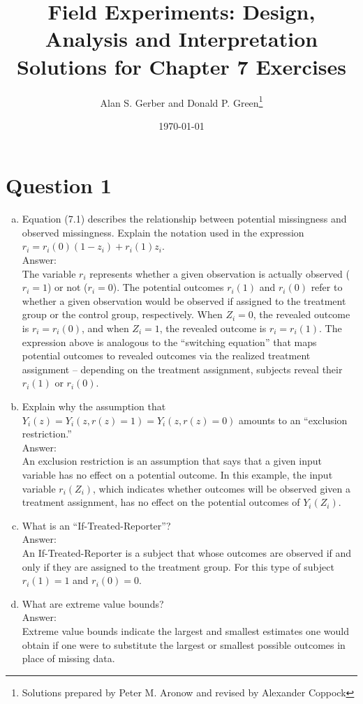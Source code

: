 \documentclass[11pt,notitlepage]{article}\usepackage[]{graphicx}\usepackage[]{color}
\title{Field Experiments: Design, Analysis and Interpretation \\
Solutions for Chapter 7 Exercises}
\author{Alan S. Gerber and Donald P. Green\footnote{Solutions prepared by Peter M. Aronow and revised by Alexander Coppock}}
\date{\today}
\begin{document}
\maketitle

\section*{Question 1}
\begin{enumerate}[a)]
\item Equation (7.1) describes the relationship between potential missingness and observed
missingness. Explain the notation used in the expression $r_i = r_i(0)(1 - z_i) + r_i(1)z_i$.\\
Answer:\\
The variable $r_i$ represents whether a given observation is actually observed ($r_i=1$) or not ($r_i=0$).  The potential outcomes $r_i(1)$ and $r_i(0)$ refer to whether a given observation would be observed if assigned to the treatment group or the control group, respectively.  When $Z_i=0$, the revealed outcome is $r_i=r_i(0)$, and when $Z_i=1$, the revealed outcome is $r_i=r_i(1)$. The expression above is analogous to the ``switching equation'' that maps potential outcomes to revealed outcomes via the realized treatment assignment -- depending on the treatment assignment, subjects reveal their $r_i(1)$ or $r_i(0)$.

\item Explain why the assumption that $Y_i(z) = Y_i(z, r(z) = 1) = Y_i(z, r(z) = 0)$ amounts to an ``exclusion restriction.'' \\
Answer:\\
An exclusion restriction is an assumption that says that a given input variable has no effect on a potential outcome.  In this example, the input variable $r_i(Z_i)$, which indicates whether outcomes will be observed given a treatment assignment, has no effect on the potential outcomes of $Y_i(Z_i ).$
\item What is an ``If-Treated-Reporter''?\\
Answer:\\
An If-Treated-Reporter is a subject that whose outcomes are observed if and only if they are assigned to the treatment group. For this type of subject $r_i(1)=1$ and $r_i(0)=0$. 
\item What are extreme value bounds? \\
Answer:\\
Extreme value bounds indicate the largest and smallest estimates one would obtain if one were to substitute the largest or smallest possible outcomes in place of missing data.
\end{enumerate}
\end{document}
